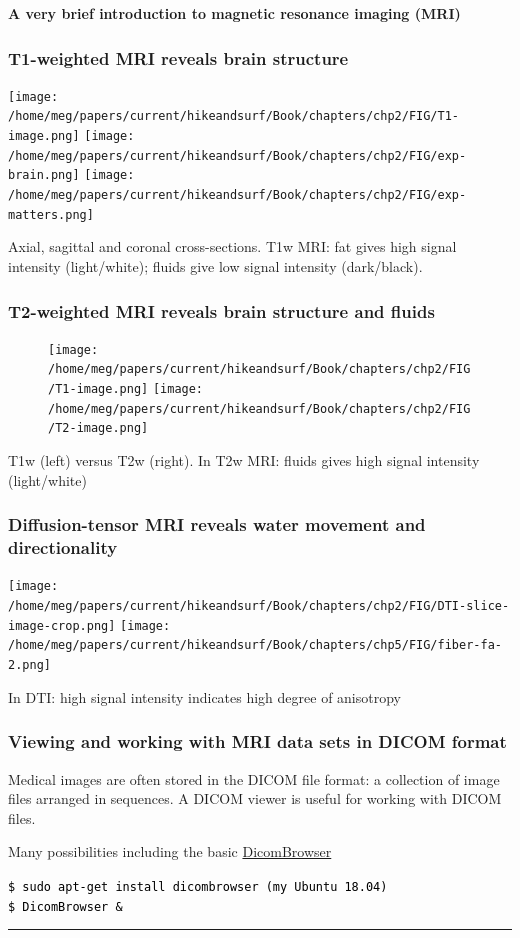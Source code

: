 \documentclass[mathserif, aspectratio=169]{beamer}
\newcommand{\mysection}[1]{\begin{frame} \begin{center} \vspace{3em} \textbf{#1} \end{center} \end{frame}}
\def\formtmpX#1#2{{\vskip3pt\noindent\fboxsep=0pt{\parbox{\textwidth}{\hbox to \textwidth{\hskip3pt\vbox{\raggedright\noindent\textbf{#2\vphantom{Qy}}}\hfill}}}\vskip3pt\par
\noindent\kern0pt}}
\newenvironment{programcode}[1]{\ignorespaces\def\stmtopen##1{##1}%
\formtmpX{programcode}{\centerline{\small{#1}}}}{\noindent\textcolor{programcode}{\rule{\columnwidth}{0pt}}\par\addvspace{\baselineskip}}%
\newcommand{\terminal}[1]{
  \vspace{-1em}
  \begin{programcode}{}%
    \colorbox{blue!10}{\parbox{0.98\textwidth}{\textcolor{black}{\texttt{#1}}}}
  \end{programcode}
  \vspace{-0.5em}
}
\begin{document}

\mysection{A very brief introduction to magnetic resonance imaging (MRI)}

\begin{frame}
  \frametitle{T1-weighted MRI reveals brain structure}
  \begin{center}
  \texttt{[image: /home/meg/papers/current/hikeandsurf/Book/chapters/chp2/FIG/T1-image.png]}
  \texttt{[image: /home/meg/papers/current/hikeandsurf/Book/chapters/chp2/FIG/exp-brain.png]}
  \texttt{[image: /home/meg/papers/current/hikeandsurf/Book/chapters/chp2/FIG/exp-matters.png]}
  \end{center}

  Axial, sagittal and coronal cross-sections. T1w MRI: fat gives high
  signal intensity (light/white); fluids give low signal intensity
  (dark/black).
\end{frame}

\begin{frame}
  \frametitle{T2-weighted MRI reveals brain structure and fluids}
\begin{figure}
  \centering
  \texttt{[image: /home/meg/papers/current/hikeandsurf/Book/chapters/chp2/FIG/T1-image.png]}
  \hspace{2em}
  \texttt{[image: /home/meg/papers/current/hikeandsurf/Book/chapters/chp2/FIG/T2-image.png]}
\end{figure}
T1w (left) versus T2w (right). In T2w MRI: fluids gives high signal intensity (light/white)
\end{frame}

\begin{frame}
  \frametitle{Diffusion-tensor MRI reveals water movement and directionality}
  \begin{center}
  \texttt{[image: /home/meg/papers/current/hikeandsurf/Book/chapters/chp2/FIG/DTI-slice-image-crop.png]}
  \hspace{2em}
  \texttt{[image: /home/meg/papers/current/hikeandsurf/Book/chapters/chp5/FIG/fiber-fa-2.png]}
  \end{center}
  In DTI: high signal intensity indicates high degree of anisotropy 
\end{frame}

\begin{frame}
  \frametitle{Viewing and working with MRI data sets in DICOM format}

  Medical images are often stored in the DICOM file format: a
  collection of image files arranged in sequences. A DICOM viewer is
  useful for working with DICOM files.

  \bigskip
  
  Many possibilities including the basic \href{https://wiki.xnat.org/xnat-tools/dicombrowser}{DicomBrowser}

  \bigskip
  
  \terminal{\$ sudo apt-get install dicombrowser \hfill(my Ubuntu 18.04)\\
  \$ DicomBrowser \&}
\end{frame}
\end{document}
